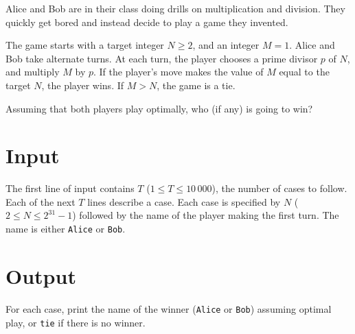 
Alice and Bob are in their class doing drills on multiplication and division.
They quickly get bored and instead decide to play a game they invented.

The game starts with a target integer $N \geq 2$, and an integer $M =
1$.  Alice and Bob take alternate turns.  At each turn, the player
chooses a prime divisor $p$ of $N$, and multiply $M$ by $p$.  
If the player's move makes the value of $M$ equal to the target $N$, 
the player wins.  If $M > N$, the game is a tie.

Assuming that both players play optimally, who (if any) is going to
win?
\section*{Input}

The first line of input contains $T$ ($1 \leq T \leq 10\,000$), the
number of cases to follow.  Each of the next $T$ lines describe a
case.  Each case is specified by $N$ ($2 \leq N \leq 2^{31}-1$)
followed by the name of the player making the first turn.  The name is
either \texttt{Alice} or \texttt{Bob}.

\section*{Output}

For each case, print the name of the winner (\texttt{Alice} or
\texttt{Bob}) assuming optimal play, or \texttt{tie} if there is no
winner.
